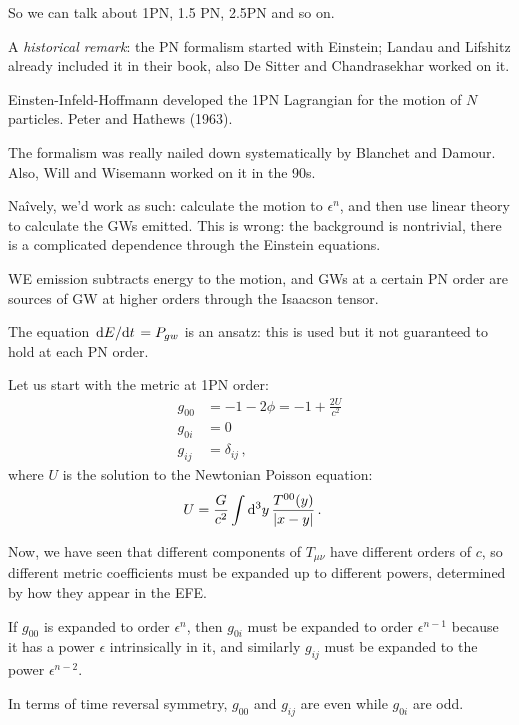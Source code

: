 \documentclass[main.tex]{subfiles}
\begin{document}
So we can talk about 1PN, 1.5 PN, 2.5PN and so on.

A \emph{historical remark}: the PN formalism started with Einstein; Landau and Lifshitz already included it in their book, also De Sitter and Chandrasekhar worked on it.

Einsten-Infeld-Hoffmann developed the 1PN Lagrangian for the motion of \(N\) particles. 
Peter and Hathews (1963). 

The formalism was really nailed down systematically by Blanchet and Damour. 
Also, Will and Wisemann worked on it in the 90s. 

Naîvely, we'd work as such: calculate the motion to \(\epsilon^n\), and then use linear theory to calculate the GWs emitted.
This is wrong: the background is nontrivial, there is a complicated dependence through the Einstein equations. 

WE emission subtracts energy to the motion, and GWs at a certain PN order are sources of GW at higher orders through the Isaacson tensor. 

The equation \(\dv*{E}{t} = P_{gw}\) is an ansatz: this is used but it not guaranteed to hold at each PN order. 

Let us start with the metric at 1PN order: 
%
\begin{align}
g_{00} &= - 1 - 2\phi = - 1 + \frac{2 U}{c^2}  \\
g_{0i} &= 0  \\
g_{ij} &= \delta_{ij}
\,,
\end{align}
%
where \(U\) is the solution to the Newtonian Poisson equation: 
%
\begin{align}
U &= \frac{G}{c^2} \int \dd[3]{y} \frac{T^{00} (y)}{\abs{x-y}}
\,.
\end{align}

Now, we have seen that different components of \(T_{\mu \nu }\) have different orders of \(c\), so different metric coefficients must be expanded up to different powers, determined by how they appear in the EFE. 

If \(g_{00} \) is expanded to order \(\epsilon^n\), then \(g_{0i} \) must be expanded to order \(\epsilon^{n-1}\) because it has a power \(\epsilon \) intrinsically in it, and similarly \(g_{ij} \) must be expanded to the power \(\epsilon^{n-2}\).


In terms of time reversal symmetry, \(g_{00}\) and \(g_{ij}\) are even while \(g_{0i}\) are odd. 
\end{document}

